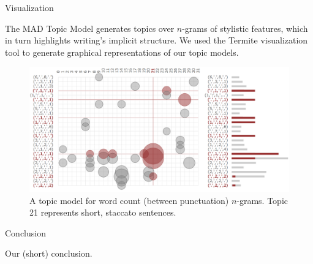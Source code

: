 \documentclass[final]{beamer}
\newlength{\onecolwid}
\begin{document}
\begin{frame}[t]
\begin{columns}[t]
\begin{column}{\onecolwid} %


\begin{block}{Visualization}

The MAD Topic Model generates topics over $n$-grams of stylistic features, which in turn highlights writing's implicit structure. We used the Termite visualization tool to generate graphical representations of our topic models.

\begin{figure}
\centering
\includegraphics[width=\linewidth]{termite.png}
\caption{A topic model for word count (between punctuation) $n$-grams. Topic 21 represents short, staccato sentences.}
\end{figure}

\end{block}


\begin{block}{Conclusion}

Our (short) conclusion.

\end{block}




\end{column}
\end{columns}
\end{frame}
\end{document}

